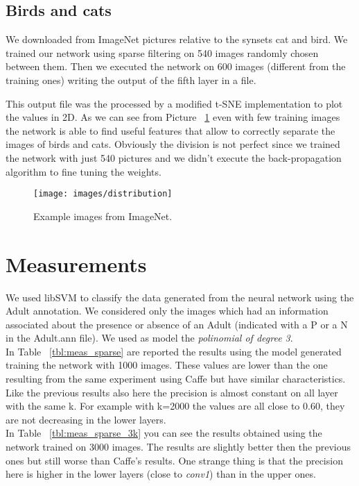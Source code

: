 \subsection{Birds and cats} \label{sec:birds_cats}

We downloaded from ImageNet pictures relative to the synsets cat and bird. We trained our network using sparse filtering on 540 images randomly chosen between them. Then we executed the network on 600 images (different from the training ones) writing the output of the fifth layer in a file.

This output file was the processed by a modified t-SNE implementation to plot the values in 2D. As we can see from Picture ~\ref{fig:bird_cat} even with few training images the network is able to find useful features that allow to correctly separate the images of birds and cats. Obviously the division is not perfect since we trained the network with just 540 pictures and we didn't execute the back-propagation algorithm to fine tuning the weights.


\begin{figure}[h!]\centering
\texttt{[image: images/distribution]}
\vspace{10pt}
\caption{Example images from ImageNet.}
\label{fig:bird_cat}
\end{figure}

\section{Measurements}

We used libSVM to classify the data generated from the neural network using the Adult annotation. We considered only the images which had an information associated about the presence or absence of an Adult (indicated with a P or a N in the Adult.ann file). We used as model the \textit{polinomial of degree 3}.\\

In Table ~\ref{tbl:meas_sparse} are reported the results using the model generated training the network with 1000 images. These values are lower than the one resulting from the same experiment using Caffe but have similar characteristics. Like the previous results also here the precision is almost constant on all layer with the same k. For example with k=2000 the values are all close to 0.60, they are not decreasing in the lower layers.\\

In Table ~\ref{tbl:meas_sparse_3k} you can see the results obtained using the network trained on 3000 images. The results are slightly better then the previous ones but still worse than Caffe's results. One strange thing is that the precision here is higher in the lower layers (close to \textit{conv1}) than in the upper ones.

